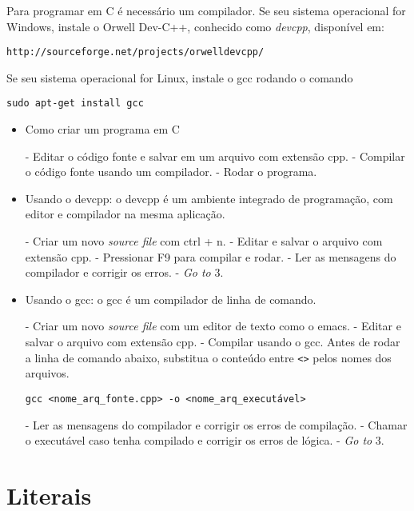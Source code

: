 Para programar em C é necessário um compilador. Se seu sistema operacional for Windows, instale o Orwell Dev-C++, conhecido como {\it devcpp}, disponível em:

{\tt http://sourceforge.net/projects/orwelldevcpp/}

Se seu sistema operacional for Linux, instale o gcc rodando o comando

{\tt sudo apt-get install gcc}

\begin{itemize}

\item Como criar um programa em C

 - Editar o código fonte e salvar em um arquivo com extensão cpp.
 - Compilar o código fonte usando um compilador.
 - Rodar o programa.

\item Usando o devcpp: o devcpp é um ambiente integrado de programação, com editor e compilador na mesma aplicação.

 - Criar um novo {\it source file} com ctrl + n.
 - Editar e salvar o arquivo com extensão cpp.
 - Pressionar F9 para compilar e rodar.
 - Ler as mensagens do compilador e corrigir os erros.
 - {\it Go to} 3.

\item Usando o gcc: o gcc é um compilador de linha de comando.

 - Criar um novo {\it source file} com um editor de texto como o emacs.
 - Editar e salvar o arquivo com extensão cpp.
 - Compilar usando o gcc. Antes de rodar a linha de comando abaixo, substitua o conteúdo entre {\tt <>} pelos nomes dos arquivos.

{\tt gcc <nome\_arq\_fonte.cpp> -o <nome\_arq\_executável>}

 - Ler as mensagens do compilador e corrigir os erros de compilação.
 - Chamar o executável caso tenha compilado e corrigir os erros de lógica.
 - {\it Go to} 3.

\end{itemize}



\section{Literais}
\label{sec:lit}

